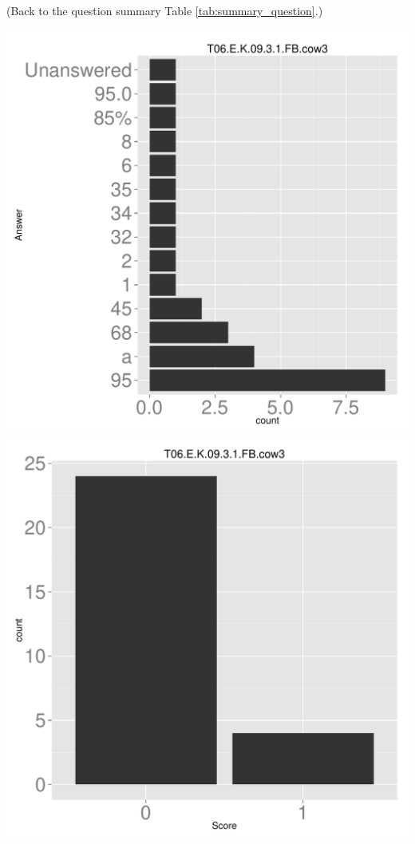 \documentclass[12pt,nohyper]{tufte-handout}\usepackage[]{graphicx}\usepackage[]{color}
\begin{document}
 (Back to the question summary Table \ref{tab:summary_question}.)

\begin{center} \includegraphics[width=.45\linewidth]{Topic06_32_answer} \includegraphics[width=.45\linewidth]{Topic06_32_score} \end{center} 
\end{document}
